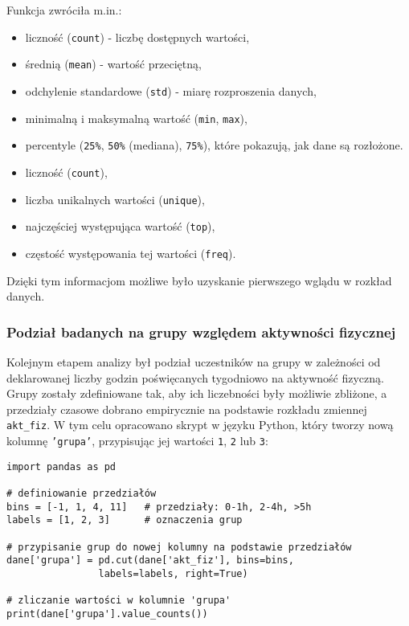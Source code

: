 \documentclass[12pt,a4paper]{article}
\begin{document}
Funkcja zwróciła m.in.:
\begin{itemize}
    \item liczność (\texttt{count}) - liczbę dostępnych wartości,
    \item średnią (\texttt{mean}) - wartość przeciętną,
    \item odchylenie standardowe (\texttt{std}) - miarę rozproszenia danych,
    \item minimalną i maksymalną wartość (\texttt{min}, \texttt{max}),
    \item percentyle (\texttt{25\%}, \texttt{50\%} (mediana), \texttt{75\%}), które pokazują, jak dane są rozłożone.
    \item liczność (\texttt{count}),
    \item liczba unikalnych wartości (\texttt{unique}),
    \item najczęściej występująca wartość (\texttt{top}),
    \item częstość występowania tej wartości (\texttt{freq}).
\end{itemize}

Dzięki tym informacjom możliwe było uzyskanie pierwszego wglądu w rozkład danych.

\newpage
\subsubsection{Podział badanych na grupy względem aktywności fizycznej}
Kolejnym etapem analizy był podział uczestników na grupy w zależności od deklarowanej liczby godzin poświęcanych tygodniowo na aktywność fizyczną. Grupy zostały zdefiniowane tak, aby ich liczebności były możliwie zbliżone, a przedziały czasowe dobrano empirycznie na podstawie rozkładu zmiennej \texttt{akt\_fiz}. W tym celu opracowano skrypt w języku Python, który tworzy nową kolumnę \texttt{'grupa'}, przypisując jej wartości \texttt{1}, \texttt{2} lub \texttt{3}:
\begin{lstlisting}
import pandas as pd

# definiowanie przedziałów
bins = [-1, 1, 4, 11]   # przedziały: 0-1h, 2-4h, >5h
labels = [1, 2, 3]      # oznaczenia grup

# przypisanie grup do nowej kolumny na podstawie przedziałów
dane['grupa'] = pd.cut(dane['akt_fiz'], bins=bins,
                labels=labels, right=True) 
            
# zliczanie wartości w kolumnie 'grupa'
print(dane['grupa'].value_counts()) 
\end{lstlisting}
\end{document}
